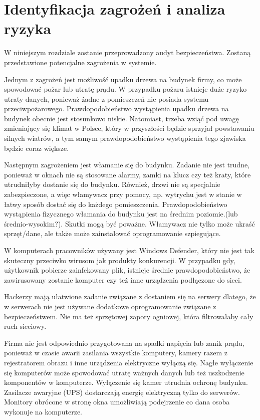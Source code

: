 \newpage\section{Identyfikacja zagrożeń \newline i analiza ryzyka}
W niniejszym rozdziale zostanie przeprowadzony audyt bezpieczeństwa. Zostaną przedstawione potencjalne zagrożenia w systemie.

Jednym z zagrożeń jest możliwość upadku drzewa na budynek firmy, co może spowodować pożar lub utratę prądu. W przypadku pożaru istnieje duże ryzyko utraty danych, ponieważ żadne z pomieszczeń nie posiada systemu przeciwpożarowego.  Prawdopodobieństwo wystąpienia upadku drzewa na budynek obecnie jest stosunkowo niskie. Natomiast, trzeba wziąć pod uwagę zmieniający się klimat w Polsce, który w przyszłości będzie sprzyjał powstawaniu silnych wiatrów, a tym samym prawdopodobieństwo wystąpienia tego zjawiska będzie coraz większe.

Następnym zagrożeniem jest włamanie się do budynku. Zadanie nie jest trudne, ponieważ w oknach nie są stosowane alarmy, zamki na klucz czy też kraty, które utrudniłyby dostanie się do budynku. Również, drzwi nie są specjalnie zabezpieczone, a więc włamywacz przy pomocy, np. wytrychu jest w stanie w łatwy sposób dostać się do każdego pomieszczenia. Prawdopodobieństwo wystąpienia fizycznego włamania do budynku jest na średnim poziomie.(lub średnio-wysokim?). Skutki mogą być poważne. Włamywacz nie tylko może ukraść sprzęt/dane, ale także może zainstalować oprogramowanie szpiegujące.

W komputerach pracowników używany jest Windows Defender, który nie jest tak skuteczny przeciwko wirusom jak produkty konkurencji. W przypadku gdy, użytkownik pobierze zainfekowany plik, istnieje średnie prawdopodobieństwo, że zawirusowany zostanie komputer czy też inne urządzenia podłączone do sieci.

Hackerzy mają ułatwione zadanie związane z dostaniem się na serwery dlatego, że w serwerach nie jest używane dodatkowe oprogramowanie związane z bezpieczeństwem. Nie ma też sprzętowej zapory ogniowej, która filtrowałaby cały ruch sieciowy.	

Firma nie jest odpowiednio przygotowana na spadki napięcia lub zanik prądu, ponieważ w czasie awarii zasilania wszystkie komputery, kamery razem z rejestratorem obrazu i inne urządzenia elektryczne wyłączą się. Nagłe wyłączenie się komputerów może spowodować utratę ważnych danych lub też uszkodzenie komponentów w komputerze. Wyłączenie się kamer utrudnia ochronę budynku. Zasilacze awaryjne (UPS) dostarczają energię elektryczną tylko do serwerów. 
Monitory obrócone w stronę okna umożliwiają podejrzenie co dana osoba wykonuje na komputerze.

